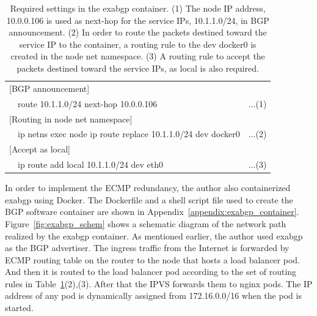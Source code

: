 \begin{table}
  \centering
  \begin{tabular}{lllr}
    \hline 
      \multicolumn{4}{l}{[BGP announcement]} \\
      \hspace{15 mm} & \multicolumn{2}{l}{route 10.1.1.0/24 next-hop 10.0.0.106} & ...(1) \\
      \multicolumn{4}{l}{[Routing in node net namespace]} \\
      \hspace{15 mm} & \multicolumn{2}{l}{ip netns exec node ip route replace 10.1.1.0/24 dev docker0} & ...(2) \\
      \multicolumn{4}{l}{[Accept as local]} \\
      \hspace{15 mm} & \multicolumn{2}{l}{ip route add local 10.1.1.0/24 dev eth0} & ...(3) \\
      \hline
  \end{tabular}
  
  \par\bigskip
  \centering
  \begin{minipage}{0.9\columnwidth}
    \caption[Required settings in the exabgp container]{
      Required settings in the exabgp container.
      (1) The node IP address, 10.0.0.106 is used as next-hop for the service IPs, 10.1.1.0/24, in BGP announcement.
      (2) In order to route the packets destined toward the service IP to the container, a routing rule to the dev docker0 is created in the node net namespace. 
      (3) A routing rule to accept the packets destined toward the service IPs,  as local is also required.
    }
    \label{table:exabgp_setting}
  \end{minipage}

\end{table}

In order to implement the ECMP redundancy, the author also containerized exabgp using Docker.
The Dockerfile and a shell script file used to create the BGP software container are shown in Appendix~\ref{appendix:exabgp_container}. 
Figure~\ref{fig:exabgp_schem} shows a schematic diagram of the network path realized by the exabgp container.
As mentioned earlier, the author used exabgp as the BGP advertiser. 
The ingress traffic from the Internet is forwarded by ECMP routing table on the router to the node that hosts a load balancer pod.
And then it is routed to the load balancer pod according to the set of routing rules in Table~\ref{table:exabgp_setting}(2),(3).
After that the IPVS forwards them to nginx pods.
The IP address of any pod is dynamically assigned from 172.16.0.0/16 when the pod is started. 

